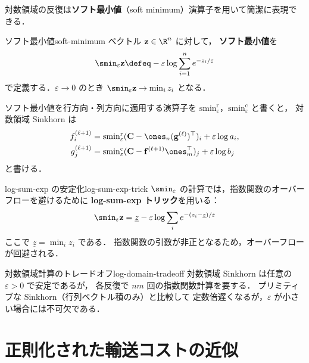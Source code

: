 対数領域の反復は\textbf{ソフト最小値}（soft minimum）演算子を用いて簡潔に表現できる．

\begin{definition}{ソフト最小値}{soft-minimum}
  ベクトル $\mathbf{z} \in \R^n$ に対して，
  \textbf{ソフト最小値}を
  \[
    \smin_\varepsilon \mathbf{z}
    \defeq -\varepsilon \log \sum_{i=1}^n e^{-z_i / \varepsilon}
  \]
  で定義する．$\varepsilon \to 0$ のとき $\smin_\varepsilon \mathbf{z} \to \min_i z_i$ となる．
\end{definition}

ソフト最小値を行方向・列方向に適用する演算子を
$\mathrm{smin}^{\mathrm{r}}_\varepsilon$，$\mathrm{smin}^{\mathrm{c}}_\varepsilon$ と書くと，
対数領域 Sinkhorn は
\begin{align*}
  f_i^{(\ell+1)}
    &= \mathrm{smin}^{\mathrm{r}}_\varepsilon
    (\mathbf{C} - \ones_n (\mathbf{g}^{(\ell)})^\top)_i + \varepsilon \log a_i,
  \\
  g_j^{(\ell+1)}
    &= \mathrm{smin}^{\mathrm{c}}_\varepsilon
    (\mathbf{C} - \mathbf{f}^{(\ell+1)} \ones_m^\top)_j + \varepsilon \log b_j
\end{align*}
と書ける．

\begin{remark}{log-sum-exp の安定化}{log-sum-exp-trick}
  $\smin_\varepsilon$ の計算では，指数関数のオーバーフローを避けるために
  \textbf{log-sum-exp トリック}を用いる：
  \[
    \smin_\varepsilon \mathbf{z}
    = \underline{z} - \varepsilon \log \sum_i e^{-(z_i - \underline{z})/\varepsilon}
  \]
  ここで $\underline{z} = \min_i z_i$ である．
  指数関数の引数が非正となるため，オーバーフローが回避される．
\end{remark}

\begin{remark}{対数領域計算のトレードオフ}{log-domain-tradeoff}
  対数領域 Sinkhorn は任意の $\varepsilon > 0$ で安定であるが，
  各反復で $nm$ 回の指数関数計算を要する．
  プリミティブな Sinkhorn（行列ベクトル積のみ）と比較して
  定数倍遅くなるが，$\varepsilon$ が小さい場合には不可欠である．
\end{remark}

\section{正則化された輸送コストの近似}
\label{sec:sinkhorn-divergence}

